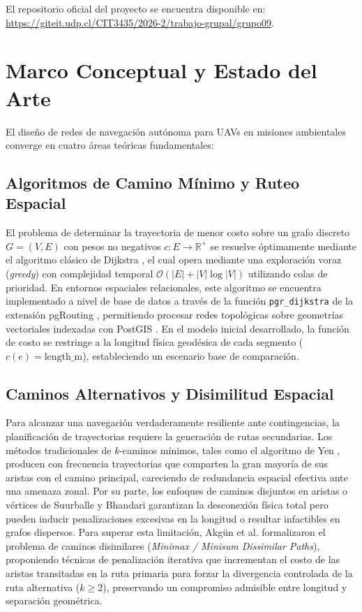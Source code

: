\documentclass[letterpaper,12pt]{article}
\begin{document}
El repositorio oficial del proyecto se encuentra disponible en: \url{https://giteit.udp.cl/CIT3435/2026-2/trabajo-grupal/grupo09}.

\section{Marco Conceptual y Estado del Arte}
\label{sec:marco_conceptual}

El diseño de redes de navegación autónoma para UAVs en misiones ambientales converge en cuatro áreas teóricas fundamentales:

\subsection{Algoritmos de Camino Mínimo y Ruteo Espacial}

El problema de determinar la trayectoria de menor costo sobre un grafo discreto $G=(V,E)$ con pesos no negativos $c: E \to \mathbb{R}^+$ se resuelve óptimamente mediante el algoritmo clásico de Dijkstra \cite{dijkstra}, el cual opera mediante una exploración voraz (\textit{greedy}) con complejidad temporal $\mathcal{O}(|E| + |V|\log |V|)$ utilizando colas de prioridad. En entornos espaciales relacionales, este algoritmo se encuentra implementado a nivel de base de datos a través de la función \texttt{pgr\_dijkstra} de la extensión pgRouting \cite{pgrouting}, permitiendo procesar redes topológicas sobre geometrías vectoriales indexadas con PostGIS \cite{postgis}. En el modelo inicial desarrollado, la función de costo se restringe a la longitud física geodésica de cada segmento ($c(e) = \text{length\_m}$), estableciendo un escenario base de comparación.

\subsection{Caminos Alternativos y Disimilitud Espacial}

Para alcanzar una navegación verdaderamente resiliente ante contingencias, la planificación de trayectorias requiere la generación de rutas secundarias. Los métodos tradicionales de $k$-caminos mínimos, tales como el algoritmo de Yen \cite{yen}, producen con frecuencia trayectorias que comparten la gran mayoría de sus aristas con el camino principal, careciendo de redundancia espacial efectiva ante una amenaza zonal. Por su parte, los enfoques de caminos disjuntos en aristas o vértices de Suurballe \cite{suurballe} y Bhandari \cite{bhandari} garantizan la desconexión física total pero pueden inducir penalizaciones excesivas en la longitud o resultar infactibles en grafos dispersos. Para superar esta limitación, Akgün et al. \cite{akgun} formalizaron el problema de caminos disimilares (\textit{Minimax / Minisum Dissimilar Paths}), proponiendo técnicas de penalización iterativa que incrementan el costo de las aristas transitadas en la ruta primaria para forzar la divergencia controlada de la ruta alternativa ($k \ge 2$), preservando un compromiso admisible entre longitud y separación geométrica.
\end{document}
